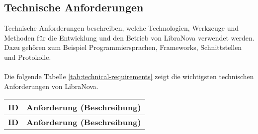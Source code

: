 \subsection{Technische  Anforderungen}

Technische Anforderungen beschreiben, welche Technologien, Werkzeuge und Methoden für die Entwicklung und den Betrieb von LibraNova verwendet werden. Dazu gehören zum Beispiel Programmiersprachen, Frameworks, Schnittstellen und Protokolle.\\ \\
Die folgende Tabelle \ref{tab:technical-requirements} zeigt die wichtigsten technischen Anforderungen von LibraNova.
\begin{longtable}{|c|p{13cm}|}
	\hline
	\textbf{ID} & \textbf{Anforderung (Beschreibung)} \\
	\hline
	\endfirsthead
	
	\hline
	\textbf{ID} & \textbf{Anforderung (Beschreibung)} \\
	\hline
	\endhead
	

\end{longtable}
